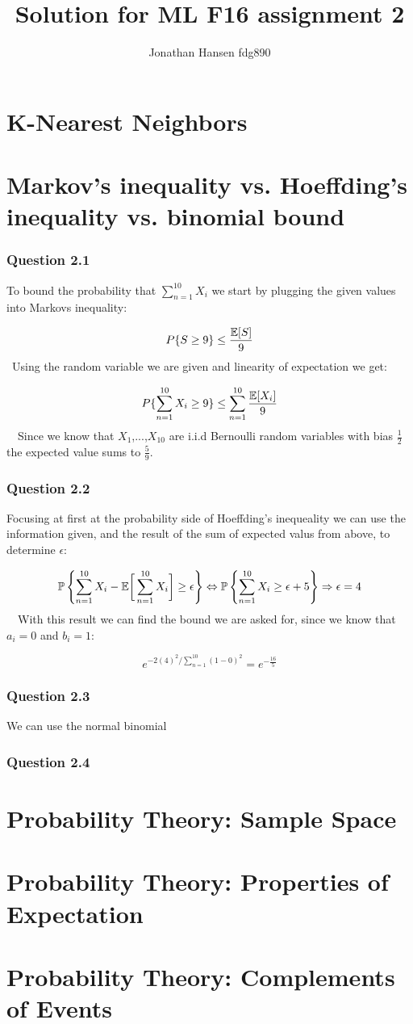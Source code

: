 \documentclass{article}
\begin{document}
\title{Solution for ML F16 assignment 2}
\author{Jonathan Hansen fdg890}
\maketitle

\section{K-Nearest Neighbors}


\section{Markov’s inequality vs. Hoeffding’s inequality vs. binomial bound}
\subsubsection*{Question 2.1}
To bound the probability that \(\sum_{n=1}^{10} X_i\) we start by plugging
the given values into Markovs inequality:

\[
P\{S \ge 9\} \le \dfrac{{\mathbb{E}}[S]}{9}
\]
\
Using the random variable we are given and linearity of expectation we get:

\[
P\{\displaystyle\sum_{n=1}^{10} X_i \ge 9\} \le \displaystyle\sum_{n=1}^{10}
\dfrac{{\mathbb{E}}[X_i]}{9}
\]
\
\
Since we know that \(X_1\),...,\(X_{10}\) are i.i.d Bernoulli random variables
with bias \(\frac{1}{2}\) the expected value sums to \(\frac{5}{9}\).

\subsubsection*{Question 2.2}
Focusing at first at the probability side of Hoeffding's inequeality we can use
the information given, and the result of the sum of expected valus from above,
to determine \(\epsilon\):

\[
\mathbb{P}\left\{\displaystyle\sum_{n=1}^{10} X_i -
{\mathbb{E}}\bigg[\displaystyle\sum_{n=1}^{10} X_i \bigg] \ge \epsilon \right\} \Leftrightarrow
\mathbb{P}\left\{\displaystyle\sum_{n=1}^{10} X_i \ge \epsilon + 5 \right\} \Rightarrow
\epsilon = 4
\]
\
\
With this result we can find the bound we are asked for, since we know that
\(a_i=0\) and \(b_i=1\):

\[
e^{-2(4)^2/\sum_{n=1}^{10}(1-0)^2} = e^{-\frac{16}{5}}
\]

\subsubsection*{Question 2.3}
We can use the normal binomial


\subsubsection*{Question 2.4}


\section{Probability Theory: Sample Space}
\section{Probability Theory: Properties of Expectation}
\section{Probability Theory: Complements of Events}

\printbibliography
\end{document}
